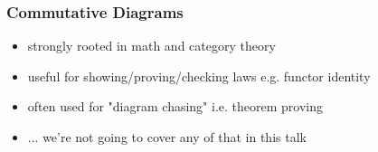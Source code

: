 \documentclass[include/preamble.tex]{subfiles}
\begin{document}

\begin{frame}[fragile]
  \frametitle{Commutative Diagrams}
  \begin{center}
    \begin{itemize}
    \item
      strongly rooted in math and category theory
    \item
      useful for showing/proving/checking laws e.g. functor identity
    \item
      often used for "diagram chasing" i.e. theorem proving
      \pause
      \vspace{1em}
    \item[]
      ... we're not going to cover any of that in this talk
    \end{itemize}
  \end{center}
\end{frame}
\end{document}
